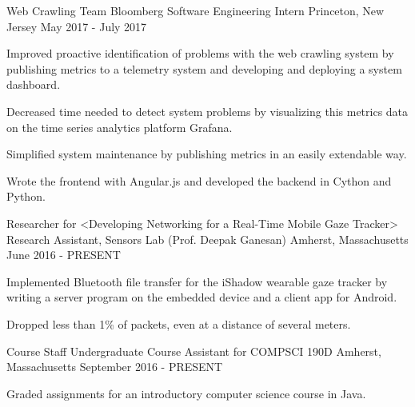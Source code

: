 \begin{cventries}
    \cventry
    {Web Crawling Team}
    {Bloomberg Software Engineering Intern}
    {Princeton, New Jersey}
    {May 2017 - July 2017}
    {
      \begin{cvitems}
        \item {Improved proactive identification of problems with the web crawling system by publishing metrics to a telemetry system and developing and deploying a system dashboard.}
        \item {Decreased time needed to detect system problems by visualizing this metrics data on the time series analytics platform Grafana.}
        \item {Simplified system maintenance by publishing metrics in an easily extendable way.}
        \item {Wrote the frontend with Angular.js and developed the backend in Cython and Python.}
      \end{cvitems} 
    }
  \cventry
    {Researcher for <Developing Networking for a Real-Time Mobile Gaze Tracker>}
    {Research Assistant, Sensors Lab (Prof. Deepak Ganesan)}
    {Amherst, Massachusetts}
    {June 2016 - PRESENT}
    {
      \begin{cvitems}
        \item {Implemented Bluetooth file transfer for the iShadow wearable gaze tracker by writing a server program on the embedded device and a client app for Android.}
        \item {Dropped less than 1\% of packets, even at a distance of several meters.} 
      \end{cvitems} 
    }
     \cventry
    {Course Staff}
    {Undergraduate Course Assistant for COMPSCI 190D}
    {Amherst, Massachusetts}
    {September 2016 - PRESENT}
    {
      \begin{cvitems}
        \item {Graded assignments for an introductory computer science course in Java.}
      \end{cvitems} 
    }
  
\end{cventries}
